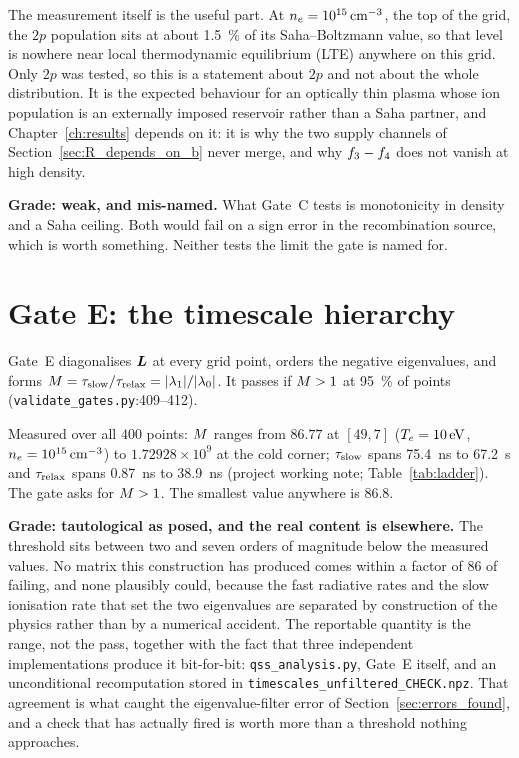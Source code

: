 The measurement itself is the useful part. At
$n_e = 10^{15}\,\si{\per\cubic\centi\metre}$, the top of the grid, the $2p$
population sits at about \SI{1.5}{\percent} of its Saha--Boltzmann value, so
that level is nowhere near local thermodynamic equilibrium (LTE) anywhere on
this grid. Only $2p$ was tested, so this is a statement about $2p$ and not about
the whole distribution. It is the expected behaviour for an optically thin
plasma whose ion population is an externally imposed reservoir rather than a
Saha partner, and Chapter~\ref{ch:results} depends on it: it is why the two
supply channels of Section~\ref{sec:R_depends_on_b} never merge, and why
$f_{3}-f_{4}$ does not vanish at high density.

\textbf{Grade: weak, and mis-named.} What Gate~C tests is monotonicity in
density and a Saha ceiling. Both would fail on a sign error in the recombination
source, which is worth something. Neither tests the limit the gate is named for.

\section{Gate E: the timescale hierarchy}
\label{sec:gate_e}

Gate~E diagonalises $\bm{L}$ at every grid point, orders the negative
eigenvalues, and forms $M = \tau_{\mathrm{slow}}/\tau_{\mathrm{relax}} = |\lambda_1|/|\lambda_0|$. It
passes if $M > 1$ at \SI{95}{\percent} of points
(\texttt{validate\_gates.py}:409--412).

Measured over all $400$ points: $M$ ranges from $86.77$ at
$[49,7]$ ($T_e = \SI{10}{\electronvolt}$,
$n_e = \SI{e15}{\per\cubic\centi\metre}$) to $1.72928\times10^{9}$ at the cold
corner; $\tau_{\mathrm{slow}}$ spans \SI{75.4}{\nano\second} to \SI{67.2}{\second} and
$\tau_{\mathrm{relax}}$ spans \SI{0.87}{\nano\second} to \SI{38.9}{\nano\second}
(project working note; Table~\ref{tab:ladder}). The gate asks for $M>1$. The smallest value
anywhere is $86.8$.

\textbf{Grade: tautological as posed, and the real content is elsewhere.} The
threshold sits between two and seven orders of magnitude below the measured
values. No matrix this construction has produced comes within a factor of $86$
of failing, and none plausibly could, because the fast radiative rates and the
slow ionisation rate that set the two eigenvalues are separated by construction
of the physics rather than by a numerical accident.
The reportable quantity is the range, not the pass, together with the fact that
three independent implementations produce it bit-for-bit: \texttt{qss\_analysis.py},
Gate~E itself, and an unconditional recomputation stored in
\texttt{timescales\_unfiltered\_CHECK.npz}. That agreement is what caught the
eigenvalue-filter error of Section~\ref{sec:errors_found}, and a check that has
actually fired is worth more than a threshold nothing approaches.

